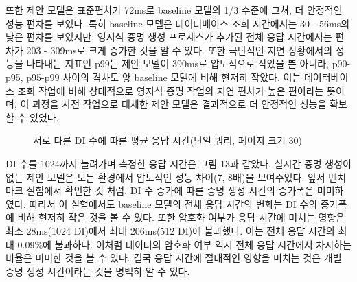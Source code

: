 \bigskip

또한 제안 모델은 표준편차가 72ms로 baseline 모델의 1/3 수준에 그쳐, 더 안정적인 성능 편차를 보였다. 특히 baseline 모델은 데이터베이스 조회 시간에서는 30 - 56ms의 낮은 편차를 보였지만, 영지식 증명 생성 프로세스가 추가된 전체 응답 시간에서는 편차가 203 - 309ms로 크게 증가한 것을 알 수 있다. 또한 극단적인 지연 상황에서의 성능을 나타내는 지표인 p99는 제안 모델이 390ms로 압도적으로 작았을 뿐 아니라, p90-p95, p95-p99 사이의 격차도 양 baseline 모델에 비해 현저히 작았다. 이는 데이터베이스 조회 작업에 비해 상대적으로 영지식 증명 작업의 지연 편차가 높은 편이라는 뜻이며, 이 과정을 사전 작업으로 대체한 제안 모델은 결과적으로 더 안정적인 성능을 확보할 수 있었다.


\begin{figure}[H]
    \centering
    \caption{서로 다른 DI 수에 따른 평균 응답 시간(단일 쿼리, 페이지 크기 30)}
\end{figure}

DI 수를 1024까지 늘려가며 측정한 응답 시간은 그림 13과 같았다. 실시간 증명 생성이 없는 제안 모델은 모든 환경에서 압도적인 성능 차이(7, 8배)을 보여주었다. 앞서 벤치마크 실험에서 확인한 것 처럼, DI 수 증가에 따른 증명 생성 시간의 증가폭은 미미하였다. 따라서 이 실험에서도 baseline 모델의 전체 응답 시간의 변화는 DI 수의 증가폭에 비해 현저히 작은 것을 볼 수 있다. 또한 암호화 여부가 응답 시간에 미치는 영향은 최소 28ms(1024 DI)에서 최대 206ms(512 DI)에 불과했다. 이는 전체 응답 시간의 최대 0.09\%에 불과하다. 이처럼 데이터의 암호화 여부 역시 전체 응답 시간에서 차지하는 비율은 미미한 것을 볼 수 있다. 결국 응답 시간에 절대적인 영향을 미치는 것은 개별 증명 생성 시간이라는 것을 명백히 알 수 있다.

